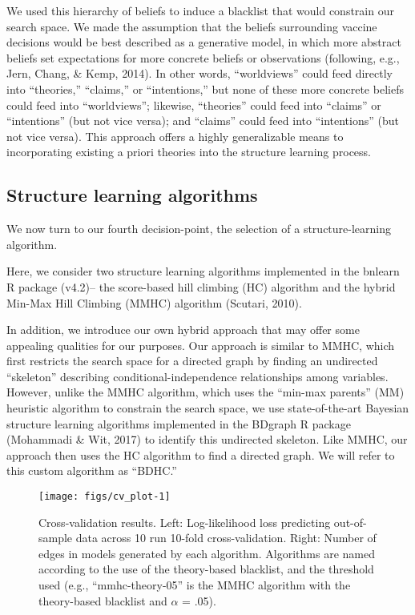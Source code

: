 \documentclass[10pt, letterpaper]{article}
\newenvironment{CodeChunk}{}{}
\begin{document}
We used this hierarchy of beliefs to induce a blacklist that would
constrain our search space. We made the assumption that the beliefs
surrounding vaccine decisions would be best described as a generative
model, in which more abstract beliefs set expectations for more concrete
beliefs or observations (following, e.g., Jern, Chang, \& Kemp, 2014).
In other words, ``worldviews'' could feed directly into ``theories,''
``claims,'' or ``intentions,'' but none of these more concrete beliefs
could feed into ``worldviews''; likewise, ``theories'' could feed into
``claims'' or ``intentions'' (but not vice versa); and ``claims'' could
feed into ``intentions'' (but not vice versa). This approach offers a
highly generalizable means to incorporating existing a priori theories
into the structure learning process.

\subsection{Structure learning
algorithms}\label{structure-learning-algorithms}

We now turn to our fourth decision-point, the selection of a
structure-learning algorithm.

Here, we consider two structure learning algorithms implemented in the
bnlearn R package (v4.2)-- the score-based hill climbing (HC) algorithm
and the hybrid Min-Max Hill Climbing (MMHC) algorithm (Scutari, 2010).

In addition, we introduce our own hybrid approach that may offer some
appealing qualities for our purposes. Our approach is similar to MMHC,
which first restricts the search space for a directed graph by finding
an undirected ``skeleton'' describing conditional-independence
relationships among variables. However, unlike the MMHC algorithm, which
uses the ``min-max parents'' (MM) heuristic algorithm to constrain the
search space, we use state-of-the-art Bayesian structure learning
algorithms implemented in the BDgraph R package (Mohammadi \& Wit, 2017)
to identify this undirected skeleton. Like MMHC, our approach then uses
the HC algorithm to find a directed graph. We will refer to this custom
algorithm as ``BDHC.''

\begin{CodeChunk}
\begin{figure*}[h]

{\centering \texttt{[image: figs/cv\_plot-1]} 

}

\caption[Cross-validation results]{Cross-validation results. Left: Log-likelihood loss predicting out-of-sample data across 10 run 10-fold cross-validation. Right: Number of edges in models generated by each algorithm. Algorithms are named according to the use of the theory-based blacklist, and the threshold used (e.g., “mmhc-theory-05” is the MMHC algorithm with the theory-based blacklist and $\alpha$ = .05).}\label{fig:cv_plot}
\end{figure*}
\end{CodeChunk}
\end{document}

